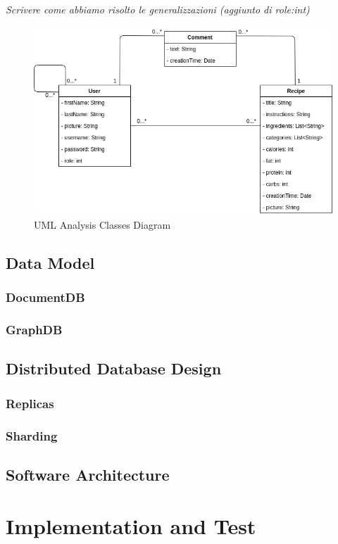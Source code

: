 \documentclass[a4paper]{report}
\begin{document}
\noindent \emph{Scrivere come abbiamo risolto le generalizzazioni (aggiunto di role:int)}
\begin{figure}[htpb]
	\centering
	\includegraphics[scale=0.58]{img/ClassDiagram.png}
	\caption{UML Analysis Classes Diagram}
\end{figure}

\section{Data Model}
\subsection{DocumentDB}
\subsection{GraphDB}
\section{Distributed Database Design}
\subsection{Replicas}
\subsection{Sharding}
\section{Software Architecture}


\chapter{Implementation and Test}
\end{document}
